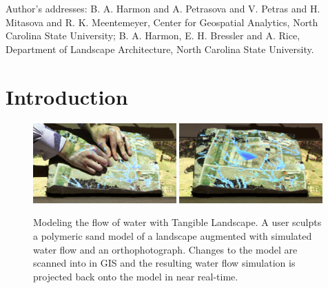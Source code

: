 \documentclass[prodmode,acmtochi]{acmsmall} %
\begin{document}
%
%



\begin{bottomstuff}
Author's addresses: B. A. Harmon {and} A. Petrasova {and} V. Petras {and} H. Mitasova {and} R. K. Meentemeyer, Center for Geospatial Analytics, North Carolina State University; B. A. Harmon, E. H. Bressler {and} A. Rice, Department of Landscape Architecture, North Carolina State University.
\end{bottomstuff}


\maketitle


\section{Introduction}

\begin{figure}
\begin{center}
		\includegraphics[width=0.49\textwidth]{images/tl_sequence_2.jpg}
		\includegraphics[width=0.49\textwidth]{images/tl_sequence_3.jpg}
	\caption{Modeling the flow of water with Tangible Landscape. 
	A user sculpts a polymeric sand model of a landscape
	augmented with simulated water flow and an orthophotograph.  
	Changes to the model are scanned into in GIS 
	and the resulting water flow simulation is
	projected back onto the model in near real-time.}
	\label{fig:tl_flow}
\end{center}
\end{figure}
\end{document}
